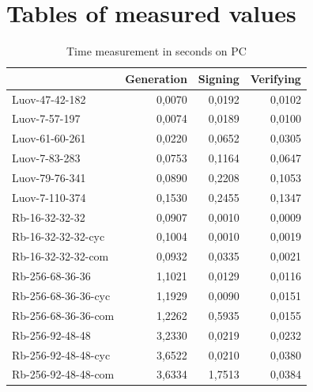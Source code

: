 \documentclass[thesis=M,english]{FITthesis}[2019/12/23]
\begin{document}
\chapter{Tables of measured values}
\begin{table}[]
\centering
\begin{tabular}{|l|r|r|r|}
\hline
                    & \multicolumn{1}{l|}{{ Generation}} & \multicolumn{1}{l|}{{ Signing}} & \multicolumn{1}{l|}{{ Verifying}} \\ \hline
 Luov-47-42-182      &  0,0070                           &  0,0192                       &  0,0102                         \\ \hline
 Luov-7-57-197       &  0,0074                          &  0,0189                       &  0,0100                           \\ \hline
 Luov-61-60-261      &  0,0220                           &  0,0652                       &  0,0305                         \\ \hline
 Luov-7-83-283       &  0,0753                          &  0,1164                       &  0,0647                         \\ \hline
 Luov-79-76-341      &  0,0890                           &  0,2208                       &  0,1053                         \\ \hline
 Luov-7-110-374      &  0,1530                           &  0,2455                       &  0,1347                         \\ \hline
 Rb-16-32-32-32      &  0,0907                          &  0,0010                        &  0,0009                         \\ \hline
 Rb-16-32-32-32-cyc  &  0,1004                          &  0,0010                        &  0,0019                         \\ \hline
 Rb-16-32-32-32-com  &  0,0932                          &  0,0335                       &  0,0021                         \\ \hline
 Rb-256-68-36-36     &  1,1021                          &  0,0129                       &  0,0116                         \\ \hline
 Rb-256-68-36-36-cyc &  1,1929                          &  0,0090                        &  0,0151                         \\ \hline
 Rb-256-68-36-36-com &  1,2262                          &  0,5935                       &  0,0155                         \\ \hline
 Rb-256-92-48-48     &  3,2330                           &  0,0219                       &  0,0232                         \\ \hline
 Rb-256-92-48-48-cyc &  3,6522                          &  0,0210                        &  0,0380                          \\ \hline
 Rb-256-92-48-48-com &  3,6334                          &  1,7513                       &  0,0384                         \\ \hline
\end{tabular}
\caption{Time measurement in seconds on PC}
\end{table}
\end{document}
